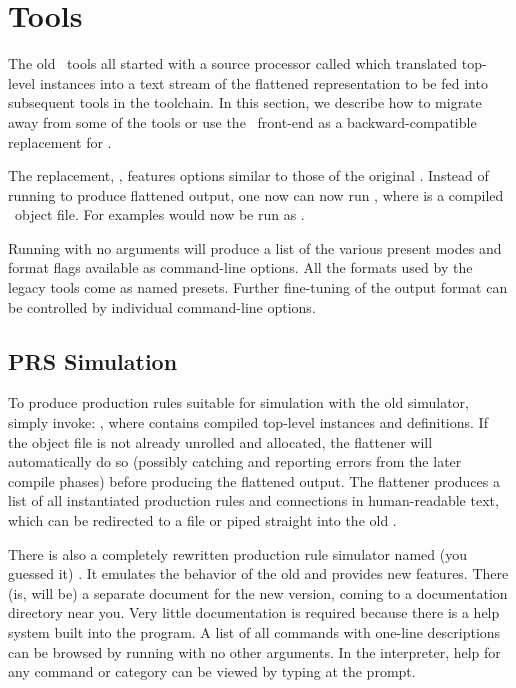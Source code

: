 
\section{Tools}
\label{sec:tools}

The old \CAST\ tools all started with a source processor called
 which translated top-level instances into a text stream of the 
flattened representation to be fed into subsequent tools in the toolchain.  
In this section, we describe how to migrate away from some of the tools or 
use the \hac\ front-end as a backward-compatible replacement for .  

The replacement, , features options
similar to those of the original .  
Instead of running 
to produce flattened output, one now can now run
, where  is a 
compiled \hac\ object file.  
For examples  would now be run as
.  

Running  with no arguments will produce a list of the various
present modes and format flags available as command-line options.  
All the formats used by the legacy tools come as named presets.  
Further fine-tuning of the output format can be controlled by individual
 command-line options.  

\subsection{PRS Simulation}
\label{sec:tools:prsim}

To produce production rules suitable for simulation with the old 
 simulator, simply invoke:
, where  contains compiled
top-level instances and definitions.  
If the object file is not already unrolled and allocated, 
the flattener will automatically do so (possibly catching and 
reporting errors from the later compile phases) before producing
the flattened output.  
The flattener produces a list of all instantiated production rules
and connections in human-readable text, which can be redirected to a file
or piped straight into the old .  

There is also a completely rewritten production rule simulator named
(you guessed it) .  
It emulates the behavior of the old  and provides new features.
There (is, will be) a separate document for the new version, 
coming to a documentation directory near you.  
Very little documentation is required because there is a help system
built into the program.  
A list of all commands with one-line descriptions can be browsed
by running  with no other arguments.  
In the interpreter, help for any command or category can be viewed
by typing  at the prompt.  


